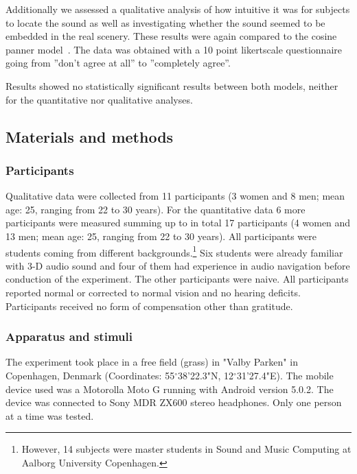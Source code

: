 \documentclass[journal]{IEEEtran}
\begin{document}
Additionally we assessed a qualitative analysis of how intuitive it was for subjects to locate the sound as well as investigating whether the sound seemed to be embedded in the real scenery. These results were again compared to the cosine panner model~\cite{AndyFarnell2010}. The data was obtained with a 10 point likertscale questionnaire going from ''don't agree at all'' to ''completely agree''.

Results showed no statistically significant results between both models, neither for the quantitative nor qualitative analyses.
\subsection{Materials and methods}
\subsubsection{Participants}
Qualitative data were collected from 11 participants (3 women and 8 men; mean age: 25, ranging from 22 to 30 years). For the quantitative data 6 more participants were measured summing up to in total 17 participants (4 women and 13 men; mean age: 25, ranging from 22 to 30 years). All participants were students coming from different backgrounds.\footnote{However, 14 subjects were master students in Sound and Music Computing at Aalborg University Copenhagen.} Six students were already familiar with 3-D audio sound and four of them had experience in audio navigation before conduction of the experiment. The other participants were naive. All participants reported normal or corrected to normal vision and no hearing deficits. Participants received no form of compensation other than gratitude. 

\subsubsection{Apparatus and stimuli}
The experiment took place in a free field (grass) in "Valby Parken" in Copenhagen, Denmark (Coordinates: 55$^\circ$38'22.3"N, 12$^\circ$31'27.4"E). The mobile device used was a Motorolla Moto G running with Android version 5.0.2. The device was connected to Sony MDR ZX600 stereo headphones. Only one person at a time was tested. 
\end{document}
